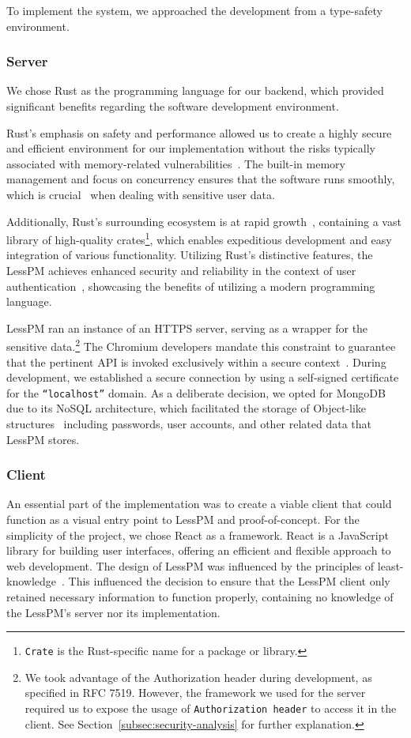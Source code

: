 To implement the system, we approached the development from a type-safety
environment.

\subsubsection{Server}
We chose Rust as the programming language for our backend, which provided
significant benefits regarding the software development environment.

Rust's emphasis on safety and performance allowed us to create a highly
secure and efficient environment for our implementation without the risks
typically associated with memory-related
vulnerabilities~\cite{rivera2019preserving}.
The built-in memory management and focus on concurrency ensures that the
software runs smoothly, which is crucial~\cite{fischer1985impossibility} when
dealing with sensitive user data.

Additionally, Rust's surrounding ecosystem is at rapid
growth~\cite{librs-stats}, containing a vast library of high-quality
crates\footnote{
  \texttt{Crate} is the Rust-specific name for a package or library.
}, which enables expeditious development and easy integration of various
functionality.
Utilizing Rust's distinctive features, the LessPM achieves enhanced security and
reliability in the context of user authentication~\cite{rivera2019preserving},
showcasing the benefits of utilizing a modern programming language.

LessPM ran an instance of an HTTPS server, serving as a wrapper for the
sensitive data.\footnote{
  We took advantage of the Authorization header during development, as specified
  in RFC 7519.
  However, the framework we used for the server required us to expose the usage
  of \texttt{Authorization header} to access it in the client.
  See Section~\ref{subsec:security-analysis} for further explanation.
}
The Chromium developers mandate this constraint to guarantee that the pertinent
API is invoked exclusively within a secure context~\cite{webdev2021credential}.
During development, we established a secure connection by using a self-signed
certificate for the \texttt{``localhost''} domain.
As a deliberate decision, we opted for MongoDB due to its NoSQL architecture,
which facilitated the storage of Object-like structures~\cite{mongodb2021nosql}
including passwords, user accounts, and other related data that LessPM stores.

\subsubsection{Client}
An essential part of the implementation was to create a viable client that could
function as a visual entry point to LessPM and proof-of-concept.
For the simplicity of the project, we chose React as a framework.
React is a JavaScript library for building user interfaces, offering an
efficient and flexible approach to web development.
The design of LessPM was influenced by the principles of
least-knowledge~\cite{lieberherr1990assuring}.
This influenced the decision to ensure that the LessPM client only retained
necessary information to function properly, containing no knowledge of
the LessPM's server nor its implementation.


